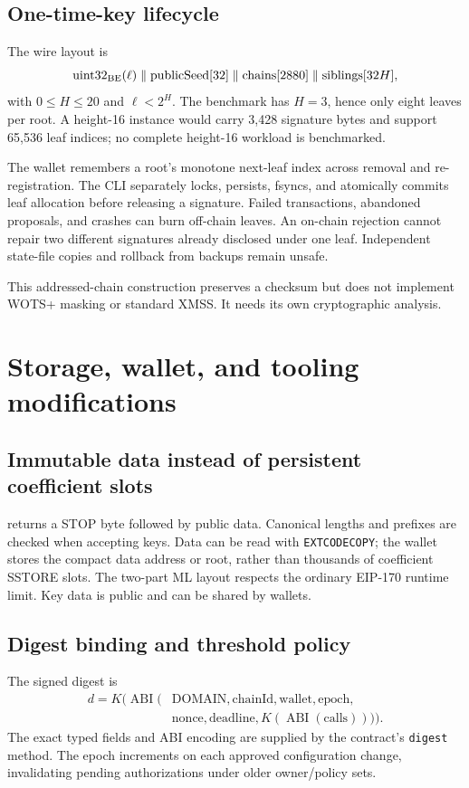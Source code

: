 \documentclass[11pt,a4paper]{article}
\newcommand{\source}[1]{\texttt{\small\detokenize{#1}}}
\begin{document}
\subsection{One-time-key lifecycle}
The wire layout is
\begin{equation*}
 \operatorname{uint32}_{\rm BE}(\ell)\parallel\mathrm{publicSeed}[32]
 \parallel\mathrm{chains}[2880]\parallel\mathrm{siblings}[32H],
\end{equation*}
with $0\leq H\leq20$ and $\ell<2^H$. The benchmark has $H=3$, hence only
eight leaves per root. A height-16 instance would carry 3,428 signature bytes
and support 65,536 leaf indices; no complete height-16 workload is benchmarked.

The wallet remembers a root's monotone next-leaf index across removal and
re-registration. The CLI separately locks, persists, fsyncs, and atomically
commits leaf allocation before releasing a signature. Failed transactions,
abandoned proposals, and crashes can burn off-chain leaves. An on-chain
rejection cannot repair two different signatures already disclosed under one
leaf. Independent state-file copies and rollback from backups remain unsafe.

This addressed-chain construction preserves a checksum but does not implement
WOTS+ masking or standard XMSS. It needs its own cryptographic analysis.

\newpage
\section{Storage, wallet, and tooling modifications}
\subsection{Immutable data instead of persistent coefficient slots}
\source{KeyData.sol} returns a STOP byte followed by public data. Canonical
lengths and prefixes are checked when accepting keys. Data can be read with
\texttt{EXTCODECOPY}; the wallet stores the compact data address or root,
rather than thousands of coefficient SSTORE slots. The two-part ML layout
respects the ordinary EIP-170 runtime limit. Key data is public and can be
shared by wallets.

\subsection{Digest binding and threshold policy}
The signed digest is
\begin{align*}
 d=K(\operatorname{ABI}(&\mathrm{DOMAIN},\mathrm{chainId},\mathrm{wallet},
 \mathrm{epoch},\\[-2pt]
 &\mathrm{nonce},\mathrm{deadline},K(\operatorname{ABI}(\mathrm{calls})))).
\end{align*}
The exact typed fields and ABI encoding are supplied by the contract's
\texttt{digest} method. The epoch increments on each approved configuration
change, invalidating pending authorizations under older owner/policy sets.
\end{document}
